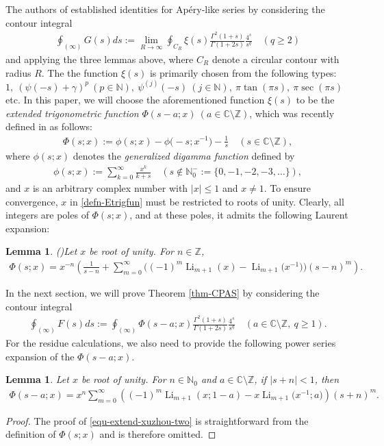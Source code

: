 \documentclass[11pt]{article}
\DeclareMathOperator{\Li}{Li}
\def\N{\mathbb{N}}
\def\Z{\mathbb{Z}}
\theoremstyle{plain}
\newtheorem{lem}[thm]{Lemma}
\theoremstyle{definition}
\begin{document}
The authors of \cite{WX2021,WLX2022} established identities for Ap\'ery-like series by considering the contour integral
\begin{align*}
\oint_{(\infty)} G(s) ds:=\lim_{R\rightarrow \infty}\oint_{C_R} \xi(s) \frac{\Gamma^2(1+s)}{\Gamma(1+2s)}\frac{4^s}{s^q}\quad (q\geq 2)
\end{align*}
and applying the three lemmas above, where $C_R$ denote a circular contour with radius $R$. The \cite{WX2021,WLX2022} the function $\xi(s)$ is primarily chosen from the following types: $1,\ (\psi(-s)+\gamma)^p\ (p\in\N),\ \psi^{(j)}(-s)\ (j\in\N),\ \pi\tan(\pi s),\ \pi\sec(\pi s)$ etc. In this paper, we will choose the aforementioned function $\xi(s)$ to be the \emph{extended trigonometric function} $\Phi(s-a;x)\ (a\in \mathbb{C}\setminus\Z)$, which was recently defined in \cite{Rui-Xu2025} as follows:
\begin{align}\label{defn-Etrigfun}
\Phi(s;x):=\phi(s;x)-\phi\Big(-s;x^{-1}\Big)-\frac1{s}\quad (s\in \mathbb{C}\setminus\Z),
\end{align}
where $\phi(s;x)$ denotes the \emph{generalized digamma function} defined by
\begin{align}
\phi(s;x):=\sum_{k=0}^\infty \frac{x^k}{k+s}\quad (s\notin\N_0^-:=\{0,-1,-2,-3,\ldots\}),
\end{align}
and $x$ is an arbitrary complex number with $|x|\leq 1$ and $x\neq 1$. To ensure convergence, $x$ in \eqref{defn-Etrigfun} must be restricted to roots of unity. Clearly, all integers are poles of $\Phi(s;x)$, and at these poles, it admits the following Laurent expansion:
\begin{lem}(\cite[Eq. (2.6)]{Rui-Xu2025})\label{lem-rui-xu-two} Let $x$ be root of unity. For $n\in \Z$,
\begin{align}\label{LEPhi-function}
\Phi(s;x)=x^{-n} \left(\frac1{s-n}+\sum_{m=0}^\infty \Big((-1)^m\Li_{m+1}(x)-\Li_{m+1}\Big(x^{-1}\Big)\Big)(s-n)^m \right).
\end{align}
\end{lem}
In the next section, we will prove Theorem \ref{thm-CPAS} by considering the contour integral
\begin{align}\label{defn-ContourIntegral}
\oint_{(\infty)} F(s) ds:=\oint_{(\infty)} \Phi(s-a;x) \frac{\Gamma^2(1+s)}{\Gamma(1+2s)}\frac{4^s}{s^q}\quad (a\in\mathbb{C}\setminus\Z,\ q\geq 1).
\end{align}
 For the residue calculations, we also need to provide the following power series expansion of the $\Phi(s-a;x)$.
\begin{lem}\label{lem-extend-xuzhou-two} Let $x$ be root of unity. For $n\in\N_0$ and $a\in \mathbb{C}\setminus \Z$, if $|s+n|<1$, then
\begin{align}\label{equ-extend-xuzhou-two}
\Phi(s-a;x)=x^n\sum_{m=0}^\infty \left((-1)^m \Li_{m+1}(x;1-a)-x \Li_{m+1}\Big(x^{-1};a\Big) \right)(s+n)^m.
\end{align}
\end{lem}
\begin{proof}
The proof of \eqref{equ-extend-xuzhou-two} is straightforward from the definition of $\Phi(s;x)$ and is therefore omitted.
\end{proof}
\end{document}
